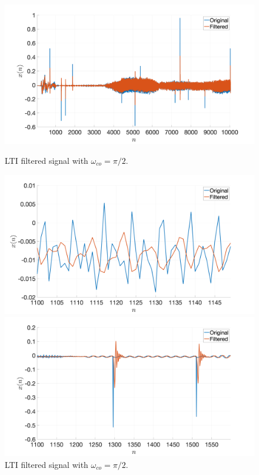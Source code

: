 \documentclass[a4paper, oneside, 11pt]{article}
\begin{document}
\begin{figure}[htbp]
	\centering
	\begin{minipage}[b]{.49\textwidth}
		\centering
		\includegraphics[width= 1.1\textwidth]{figures/R2c.png}
		\caption{LTI filtered signal with $\omega_{co} = \pi/2$.}
		\label{fig:R2c}
	\end{minipage}
	\hfill
	\begin{minipage}[b]{.49\textwidth}
		\centering
		\includegraphics[width= 1.1\textwidth]{figures/R2c_smallAmp.png}
		\caption{LTI filtered signal with $\omega_{co} = \pi/2$.}
		\label{fig:R2c_smallAmp}
	\end{minipage}
\begin{minipage}[b]{.49\textwidth}
	\centering
	\includegraphics[width= 1.1\textwidth]{figures/R2c_zoomNoise.png}

\end{minipage}
\end{figure}
\end{document}
